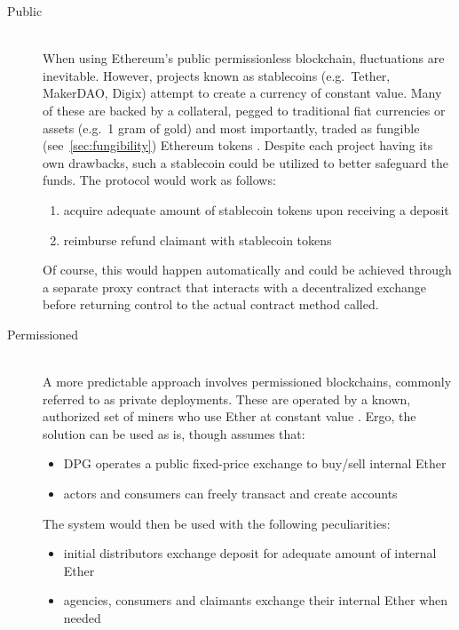 \begin{description}
	\item[Public]
	\hfill \\
	When using Ethereum's public permissionless blockchain, fluctuations are inevitable. However, projects known as stablecoins (e.g.~Tether, MakerDAO, Digix) attempt to create a currency of constant value. Many of these are backed by a collateral, pegged to traditional fiat currencies or assets (e.g.~1 gram of gold) and most importantly, traded as fungible (see~\ref{sec:fungibility}) Ethereum tokens \cite{}. Despite each project having its own drawbacks, such a stablecoin could be utilized to better safeguard the funds. The protocol would work as follows: 
	
	\begin{enumerate}
  		\item acquire adequate amount of stablecoin tokens upon receiving a deposit
  		\item reimburse refund claimant with stablecoin tokens
	\end{enumerate}

	Of course, this would happen automatically and could be achieved through a separate proxy contract that interacts with a decentralized exchange before returning control to the actual contract method called. 
	
	\item[Permissioned]
	\hfill \\
	A more predictable approach involves permissioned blockchains, commonly referred to as private deployments. These are operated by a known, authorized set of miners who use Ether at constant value \cite{}. Ergo, the solution can be used as is, though assumes that:

	\begin{itemize}
  		\item \ac{DPG} operates a public fixed-price exchange to buy/sell internal Ether
  		\item actors and consumers can freely transact and create accounts
	\end{itemize}
	
	The system would then be used with the following peculiarities:
		
	\begin{itemize}
  		\item initial distributors exchange deposit for adequate amount of internal Ether 
  		\item agencies, consumers and claimants exchange their internal Ether when needed
	\end{itemize}
	

\end{description}
